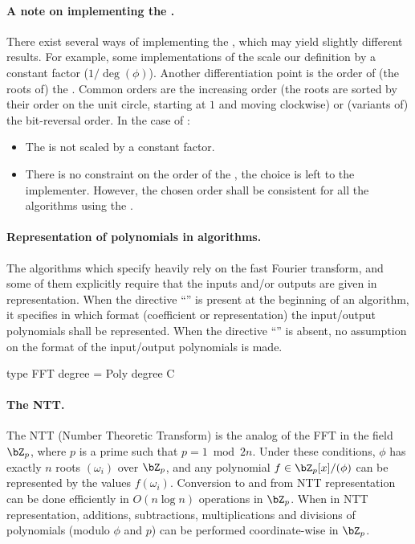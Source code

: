  \paragraph{A note on implementing the \fft.} There exist several ways of implementing the \fft, which may yield slightly different results. For example, some implementations of the \fft scale our definition by a constant factor (\eg $1/\deg(\phi)$). Another differentiation point is the order of (the roots of) the \fft. Common orders are the increasing order (\ie the roots are sorted by their order on the unit circle, starting at $1$ and moving clockwise) or (variants of) the bit-reversal order. In the case of \falcon:
 \begin{itemize}
  \item The \fft is not scaled by a constant factor.
  \item There is no constraint on the order of the \fft, the choice is left to the implementer. However, the chosen order shall be consistent for all the algorithms using the \fft.
 \end{itemize}

 
 \paragraph{Representation of polynomials in algorithms.} The algorithms which specify \falcon heavily rely on the fast Fourier transform, and some of them explicitly require that the inputs and/or outputs are given in \fft representation. When the directive ``\algorithmicformat'' is present at the beginning of an algorithm, it specifies in which format (coefficient or \fft representation) the input/output polynomials shall be represented. When the directive ``\algorithmicformat'' is absent, no assumption on the format of the input/output polynomials is made.
   
\begin{code}
  type FFT degree = Poly degree C
\end{code}

 \paragraph{The NTT.} The NTT (Number Theoretic Transform) is the analog
 of the FFT in the field $\bZ_p$, where $p$ is a prime such that $p = 1
 \bmod 2n$. Under these
 conditions, $\phi$ has exactly $n$ roots $(\omega_i)$ over $\bZ_p$, and
 any polynomial $f \in \bZ_p[x]/(\phi)$ can be represented by the values
 $f(\omega_i)$. Conversion to and from NTT representation can be done
 efficiently in $O(n \log n)$ operations in $\bZ_p$. When in NTT
 representation, additions, subtractions, multiplications and divisions
 of polynomials (modulo $\phi$ and $p$) can be performed coordinate-wise
 in $\bZ_p$.
 
